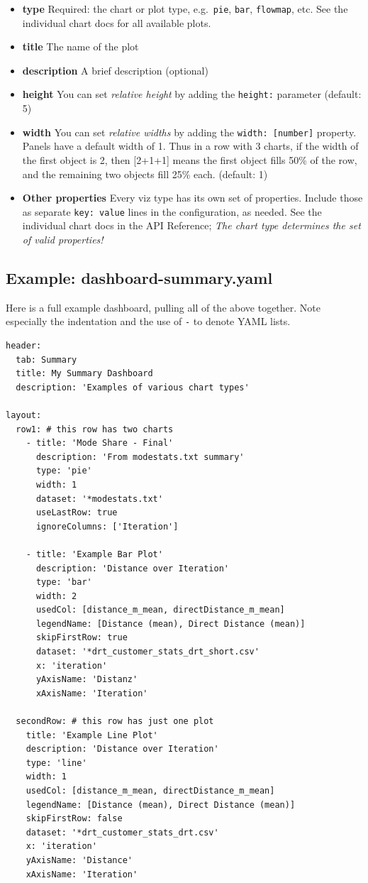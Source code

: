 \begin{itemize}
\tightlist
\item
  \textbf{type} Required: the chart or plot type, e.g.~\texttt{pie},
  \texttt{bar}, \texttt{flowmap}, etc. See the individual chart docs for
  all available plots.
\item
  \textbf{title} The name of the plot
\item
  \textbf{description} A brief description (optional)
\item
  \textbf{height} You can set \emph{relative height} by adding the
  \texttt{height:} parameter (default: 5)
\item
  \textbf{width} You can set \emph{relative widths} by adding the
  \texttt{width:\ {[}number{]}} property. Panels have a default width of
  1. Thus in a row with 3 charts, if the width of the first object is 2,
  then {[}2+1+1{]} means the first object fills 50\% of the row, and the
  remaining two objects fill 25\% each. (default: 1)
\item
  \textbf{Other properties} Every viz type has its own set of
  properties. Include those as separate \texttt{key:\ value} lines in
  the configuration, as needed. See the individual chart docs in the API
  Reference; \emph{The chart type determines the set of valid
  properties!}
\end{itemize}

\hypertarget{example-dashboard-summary.yaml}{%
\subsection{Example:
dashboard-summary.yaml}\label{example-dashboard-summary.yaml}}

Here is a full example dashboard, pulling all of the above together.
Note especially the indentation and the use of \texttt{-} to denote YAML
lists.

\begin{lstlisting}
header:
  tab: Summary
  title: My Summary Dashboard
  description: 'Examples of various chart types'

layout:
  row1: # this row has two charts
    - title: 'Mode Share - Final'
      description: 'From modestats.txt summary'
      type: 'pie'
      width: 1
      dataset: '*modestats.txt'
      useLastRow: true
      ignoreColumns: ['Iteration']

    - title: 'Example Bar Plot'
      description: 'Distance over Iteration'
      type: 'bar'
      width: 2
      usedCol: [distance_m_mean, directDistance_m_mean]
      legendName: [Distance (mean), Direct Distance (mean)]
      skipFirstRow: true
      dataset: '*drt_customer_stats_drt_short.csv'
      x: 'iteration'
      yAxisName: 'Distanz'
      xAxisName: 'Iteration'

  secondRow: # this row has just one plot
    title: 'Example Line Plot'
    description: 'Distance over Iteration'
    type: 'line'
    width: 1
    usedCol: [distance_m_mean, directDistance_m_mean]
    legendName: [Distance (mean), Direct Distance (mean)]
    skipFirstRow: false
    dataset: '*drt_customer_stats_drt.csv'
    x: 'iteration'
    yAxisName: 'Distance'
    xAxisName: 'Iteration'
\end{lstlisting}